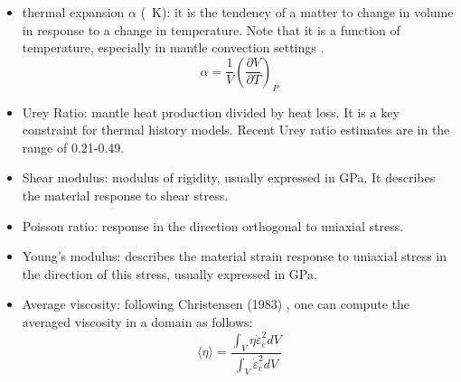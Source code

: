 \begin{itemize}
\item {\color{violet} thermal expansion} $\alpha$ (\si{\per\kelvin}): 
it is the tendency of a matter to change in volume in response to a change in temperature. 
Note that it is a function of temperature, especially in mantle convection settings \cite{mika13}.
\[
\alpha = \frac{1}{V} \left(\frac{\partial V}{\partial T}\right)_P
\]


\item {\color{violet} Urey Ratio}: mantle heat production divided by heat loss. It is a key constraint 
for thermal history models. Recent Urey ratio estimates are in the range of 0.21-0.49. \cite{lecm11}

\item {\color{violet} Shear modulus}: modulus of rigidity, usually expressed in \si{\giga\pascal}. 
It describes the material response to shear stress.

\item {\color{violet} Poisson ratio}: response in the direction orthogonal to uniaxial stress.

\item {\color{violet} Young's modulus}: describes the material strain response to uniaxial stress
in the direction of this stress, usually expressed in \si{\giga\pascal}.

\item {\color{violet} Average viscosity}: following Christensen (1983) \cite{chri83b}, 
one can compute the averaged viscosity in a domain as follows:
\begin{equation}
\langle \eta \rangle = \frac{\int_V \eta \dot{\varepsilon}_e^2 dV}{\int_V  \dot{\varepsilon}_e^2 dV }
\label{eq:avrgeta}
\end{equation}


\end{itemize}




